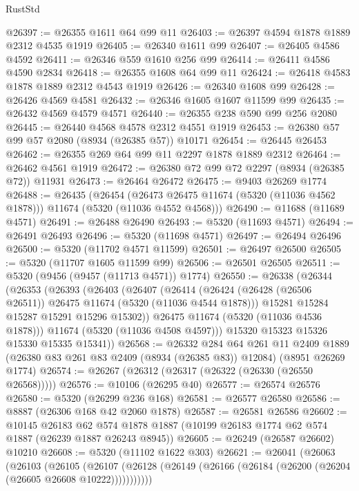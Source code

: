 \begin{lexlean}{RustStd}
\begin{coremodule}
@26397 := @26355 @1611 @64 @99 @11
@26403 := @26397 @4594 @1878 @1889 @2312 @4535 @1919
@26405 := @26340 @1611 @99
@26407 := @26405 @4586 @4592
@26411 := @26346 @559 @1610 @256 @99
@26414 := @26411 @4586 @4590 @2834
@26418 := @26355 @1608 @64 @99 @11
@26424 := @26418 @4583 @1878 @1889 @2312 @4543 @1919
@26426 := @26340 @1608 @99
@26428 := @26426 @4569 @4581
@26432 := @26346 @1605 @1607 @11599 @99
@26435 := @26432 @4569 @4579 @4571
@26440 := @26355 @238 @590 @99 @256 @2080
@26445 := @26440 @4568 @4578 @2312 @4551 @1919
@26453 := @26380 @57 @99 @57 @2080 (@8934 (@26385 @57)) @10171
@26454 := @26445 @26453
@26462 := @26355 @269 @64 @99 @11 @2297 @1878 @1889 @2312
@26464 := @26462 @4561 @1919
@26472 := @26380 @72 @99 @72 @2297 (@8934 (@26385 @72)) @11931
@26473 := @26464 @26472
@26475 := @9403 @26269 @1774
@26488 := @26435
    (@26454 (@26473 @26475 @11674 (@5320 (@11036 @4562 @1878))) @11674 (@5320 (@11036 @4552 @4568)))
@26490 := @11688 (@11689 @4571)
@26491 := @26488 @26490
@26493 := @5320 (@11693 @4571)
@26494 := @26491 @26493
@26496 := @5320 (@11698 @4571)
@26497 := @26494 @26496
@26500 := @5320 (@11702 @4571 @11599)
@26501 := @26497 @26500
@26505 := @5320 (@11707 @1605 @11599 @99)
@26506 := @26501 @26505
@26511 := @5320 (@9456 (@9457 (@11713 @4571)) @1774)
@26550 := @26338
    (@26344
      (@26353
        (@26393
          (@26403
            (@26407
              (@26414
                (@26424 (@26428 (@26506 @26511)) @26475 @11674 (@5320 (@11036 @4544 @1878)))
                @15281
                @15284
                @15287
                @15291
                @15296
                @15302))
            @26475
            @11674
            (@5320 (@11036 @4536 @1878)))
          @11674
          (@5320 (@11036 @4508 @4597)))
        @15320
        @15323
        @15326
        @15330
        @15335
        @15341))
@26568 := @26332
    @284
    @64
    @261
    @11
    @2409
    @1889
    (@26380 @83 @261 @83 @2409 (@8934 (@26385 @83)) @12084)
    (@8951 @26269 @1774)
@26574 := @26267 (@26312 (@26317 (@26322 (@26330 (@26550 @26568)))))
@26576 := @10106 (@26295 @40)
@26577 := @26574 @26576
@26580 := @5320 (@26299 @236 @168)
@26581 := @26577 @26580
@26586 := @8887 (@26306 @168 @42 @2060 @1878)
@26587 := @26581 @26586
@26602 := @10145
    @26183
    @62
    @574
    @1878
    @1887
    (@10199 @26183 @1774 @62 @574 @1887 (@26239 @1887 @26243 @8945))
@26605 := @26249 (@26587 @26602) @10210
@26608 := @5320 (@11102 @1622 @303)
@26621 := @26041
    (@26063
      (@26103
        (@26105
          (@26107 (@26128 (@26149 (@26166 (@26184 (@26200 (@26204 (@26605 @26608 @10222)))))))))))

\end{coremodule}
\end{lexlean}
